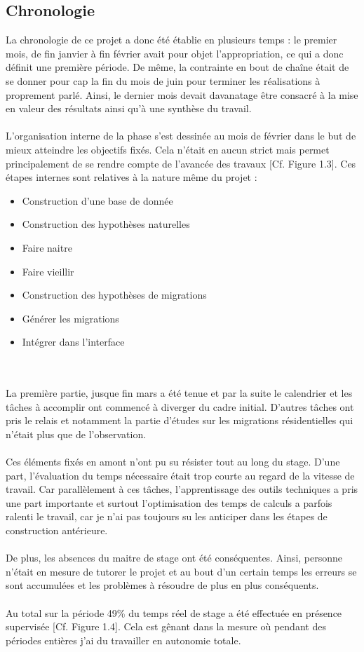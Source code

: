 \documentclass{bredele}
\begin{document}
\subsection{Chronologie}
La chronologie de ce projet a donc été établie en plusieurs temps : le premier mois, de fin janvier à fin février avait pour objet l'appropriation, ce qui a donc définit une première période.
De même, la contrainte en bout de chaîne était de se donner pour cap la fin du mois de juin pour terminer les réalisations à proprement parlé. Ainsi, le dernier mois devait davanatage être consacré à la mise en valeur des résultats ainsi qu'à une synthèse du travail.
\\\\L'organisation interne de la phase s'est dessinée au mois de février dans le but de mieux atteindre les objectifs fixés. Cela n'était en aucun strict mais permet principalement de se rendre compte de l'avancée des travaux [Cf. Figure 1.3]. Ces étapes internes sont relatives à la nature même du projet :
\begin{itemize}
	\item Construction d'une base de donnée
	\item Construction des hypothèses naturelles
  \item Faire naitre
	\item Faire vieillir
	\item Construction des hypothèses de migrations
	\item Générer les migrations
	\item Intégrer dans l'interface
\end{itemize}
\\\\La première partie, jusque fin mars a été tenue et par la suite le calendrier et les tâches à accomplir ont commencé à diverger du cadre initial. D'autres tâches ont pris le relais et notamment la partie d'études sur les migrations résidentielles qui n'était plus que de l'observation.
\\\\Ces éléments fixés en amont n'ont pu su résister tout au long du stage. D'une part, l'évaluation du temps nécessaire était trop courte au regard de la vitesse de travail. Car parallèlement à ces tâches, l'apprentissage des outils techniques a pris une part importante et surtout l'optimisation des temps de calculs a parfois ralenti le travail, car je n'ai pas toujours su les anticiper dans les étapes de construction antérieure.
\\\\De plus, les absences du maitre de stage ont été conséquentes. Ainsi, personne n'était en mesure de tutorer le projet et au bout d'un certain temps les erreurs se sont accumulées et les problèmes à résoudre de plus en plus conséquents.
\\\\Au total sur la période 49\% du temps réel de stage a été effectuée en présence supervisée [Cf. Figure 1.4]. Cela est gênant dans la mesure où pendant des périodes entières j'ai du travailler en autonomie totale.
\end{document}
